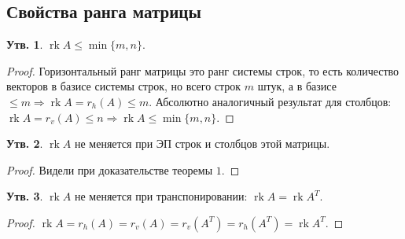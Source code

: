 \documentclass[12pt]{article}
\theoremstyle{definition}
\newtheorem{prop}{Утв.}
\DeclareMathOperator{\rk}{\text{rk}}
\begin{document}
\subsection*{Свойства ранга матрицы}
\begin{prop}
	$\rk{A} \leq \min{\{m,n\}}$.
\end{prop}
\begin{proof}
	Горизонтальный ранг матрицы это ранг системы строк, то есть количество векторов в базисе системы строк, но всего строк $m$ штук, а в базисе $\leq m\Rightarrow \rk{A} = r_h(A) \leq m$. Абсолютно аналогичный результат для столбцов: $\rk{A} = r_v(A) \leq n \Rightarrow \rk{A} \leq \min{\{m,n\}}$.
\end{proof}
\begin{prop}
	$\rk{A}$ не меняется при ЭП строк и столбцов этой матрицы.
\end{prop}
\begin{proof}
	Видели при доказательстве теоремы $1$. 
\end{proof}
\begin{prop}
	$\rk{A}$ не меняется при транспонировании: $\rk{A} = \rk{A^T}$.
\end{prop}
\begin{proof}
	$\rk{A} = r_h(A) = r_v(A) = r_v(A^T) = r_h(A^T) = \rk{A^T}$.
\end{proof}
\end{document}
